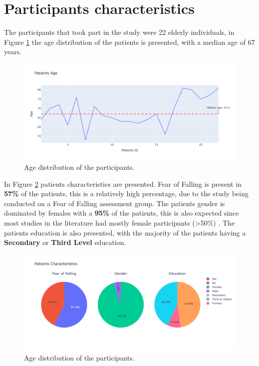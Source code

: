     \section{Participants characteristics}
        The participants that took part in the study were 22 elderly individuals, in Figure \ref{fig:age_distribution} the age distribution of the patients is presented, with a median age of 67 years. 
        \newpage 
        \begin{figure}[H]
            \centering
            \includegraphics[width=1.0\textwidth]{./resources/other/patients-age.png}
            \caption{Age distribution of the participants.}
            \label{fig:age_distribution}
        \end{figure}

        In Figure \ref{fig:patients_characteristics} patients characteristics are presented. Fear of Falling is present in \textbf{57\%} of the patients, this is a relatively high percentage, due to the study being conducted on a Fear of Falling assessment group. The patients gender is dominated by females with a \textbf{95\%} of the patients, this is also expected since most studies in the literature had mostly female participants (>50\%) \cite{mackay_fear_2021}. The patients education is also presented, with the majority of the patients having a \textbf{Secondary} or \textbf{Third Level} education.
        
        \begin{figure}[H]
            \centering
            \includegraphics[width=1.0\textwidth]{./resources/other/patients-char.png}
            \caption{Age distribution of the participants.}
            \label{fig:patients_characteristics}
        \end{figure}

